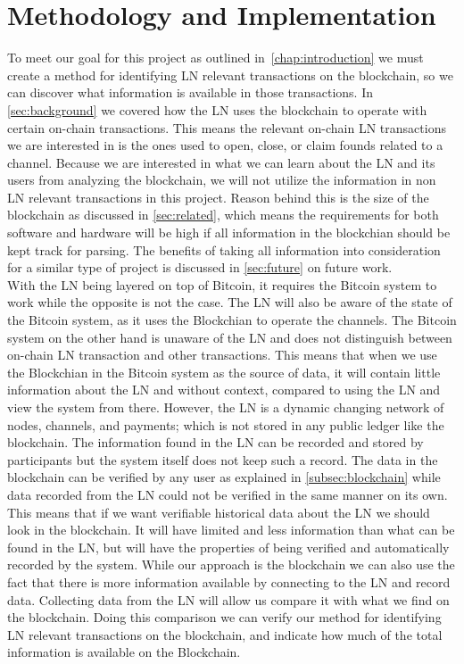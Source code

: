 \chapter{Methodology and Implementation}
\label{chap:metodology}

To meet our goal for this project as outlined in~\cref{chap:introduction} we must create a method for identifying LN relevant transactions on the blockchain, so we can discover what information is available in those transactions. In \cref{sec:background} we covered how the LN uses the blockchain to operate with certain on-chain transactions. This means the relevant on-chain LN transactions we are interested in is the ones used to open, close, or claim founds related to a channel. Because we are interested in what we can learn about the LN and its users from analyzing the blockchain, we will not utilize the information in non LN relevant transactions in this project. Reason behind this is the size of the blockchain as discussed in \cref{sec:related}, which means the requirements for both software and hardware will be high if all information in the blockchian should be kept track for parsing. The benefits of taking all information into consideration for a similar type of project is discussed in \cref{sec:future} on future work. 
\\

With the LN being layered on top of Bitcoin, it requires the Bitcoin system to work while the opposite is not the case. The LN will also be aware of the state of the Bitcoin system, as it uses the Blockchian to operate the channels. The Bitcoin system on the other hand is unaware of the LN and does not distinguish between on-chain LN transaction and other transactions. This means that when we use the Blockchian in the Bitcoin system as the source of data, it will contain little information about the LN and without context, compared to using the LN and view the system from there. However, the LN is a dynamic changing network of nodes, channels, and payments; which is not stored in any public ledger like the blockchain. The information found in the LN can be recorded and stored by participants but the system itself does not keep such a record. The data in the blockchain can be verified by any user as explained in \cref{subsec:blockchain} while data recorded from the LN could not be verified in the same manner on its own.
This means that if we want verifiable historical data about the LN we should look in the blockchain. It will have limited and less information than what can be found in the LN, but will have the properties of being verified and automatically recorded by the system.
While our approach is the blockchain we can also use the fact that there is more information available by connecting to the LN and record data. Collecting data from the LN will allow us compare it with what we find on the blockchain. Doing this comparison we can verify our method for identifying LN relevant transactions on the blockchain, and indicate how much of the total information is available on the Blockchain.
\\

